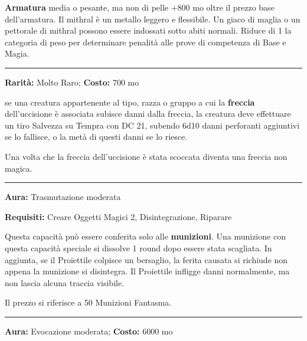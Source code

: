\begin{multicols}{2}
\textbf{Armatura} media o pesante, ma non di pelle +800 mo oltre il prezzo base dell'armatura. Il mithral è un metallo leggero e flessibile. Un giaco di maglia o un pettorale di mithral possono essere indossati sotto abiti normali. Riduce di 1 la categoria di peso per determinare penalità alle prove di competenza di Base e Magia.

\smallskip\noindent\rule{\linewidth}{2pt}  \hypertarget{Munizionedell'Uccisione}{}\smallskip{}\noindent\label{Munizionedell'Uccisione}

\textbf{Rarità:} Molto Raro; \textbf{Costo:} 700 mo

se una creatura appartenente al tipo, razza o gruppo a cui la \textbf{freccia} dell'uccisione è associata subisce danni dalla freccia, la creatura deve effettuare un tiro Salvezza su Tempra con DC 21, subendo 6d10 danni perforanti aggiuntivi se lo fallisce, o la metà di questi danni se lo riesce.

Una volta che la freccia dell'uccisione è stata scoccata diventa una freccia non magica.

\smallskip\noindent\rule{\linewidth}{2pt}  \hypertarget{MunizioneFantasma}{}\smallskip{}\noindent\label{MunizioneFantasma}

\textbf{Aura:} Trasmutazione moderata

\textbf{Requisiti:} Creare Oggetti Magici 2, Disintegrazione, Riparare

Questa capacità può essere conferita solo alle \textbf{munizioni}. Una munizione con questa capacità speciale si dissolve 1 round dopo essere stata scagliata. In aggiunta, se il Proiettile colpisce un bersaglio, la ferita causata si richiude non appena la munizione si disintegra. Il Proiettile infligge danni normalmente, ma non lascia alcuna traccia visibile.

Il prezzo si riferisce a 50 Munizioni Fantasma.

\smallskip\noindent\rule{\linewidth}{2pt}  \hypertarget{MunizioniInfinite}{}\smallskip{}\noindent\label{MunizioniInfinite}

\textbf{Aura:} Evocazione moderata; \textbf{Costo:} 6000 mo


\end{multicols}
